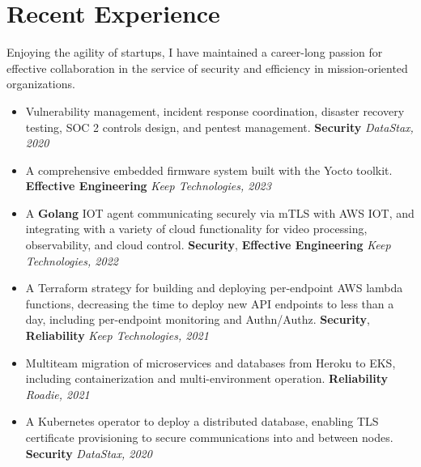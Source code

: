 \documentclass[letterpaper,10pt]{article}
\begin{document}

\section{Recent Experience}
Enjoying the agility of startups, I have maintained a
career-long passion for effective collaboration in the service of security and efficiency in mission-oriented organizations.
\begin{itemize}
	\item Vulnerability management, incident response coordination, disaster recovery testing, SOC 2 controls design, and pentest management. \textbf{Security} \textit{DataStax, 2020}
	      \setlength\itemsep{0.1em} \item A comprehensive embedded firmware system
	      built with the Yocto toolkit. \textbf{Effective Engineering} \textit{Keep Technologies, 2023}
	\item A \textbf{Golang} IOT agent communicating securely via mTLS with AWS IOT, and integrating with a variety of cloud functionality for video processing, observability, and cloud control. \textbf{Security}, \textbf{Effective Engineering} \textit{Keep Technologies, 2022}
	\item A Terraform strategy for building and deploying per-endpoint AWS lambda functions, decreasing the time to deploy new API endpoints to less than a day, including per-endpoint monitoring and Authn/Authz. \textbf{Security}, \textbf{Reliability} \textit{Keep Technologies, 2021}
	\item Multiteam migration of microservices and databases from Heroku to EKS, including containerization and multi-environment operation. \textbf{Reliability} \textit{Roadie, 2021}
	\item A Kubernetes operator to deploy a distributed database, enabling TLS certificate provisioning to secure communications into and between nodes. \textbf{Security} \textit{DataStax, 2020}
\end{itemize}
\end{document}
